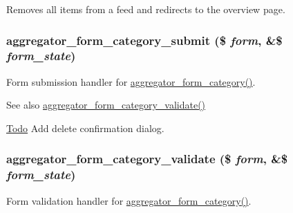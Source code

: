 Removes all items from a feed and redirects to the overview page. \hypertarget{aggregator_8admin_8inc_a56c1cadf416d17bd8dd8a53cc6ed5aeb}{
\subsubsection[{aggregator\_\-form\_\-category\_\-submit}]{\setlength{\rightskip}{0pt plus 5cm}aggregator\_\-form\_\-category\_\-submit (\$ {\em form}, \/  \&\$ {\em form\_\-state})}}
\label{aggregator_8admin_8inc_a56c1cadf416d17bd8dd8a53cc6ed5aeb}
Form submission handler for \hyperlink{group__forms_gaf977e902973833a5a8fe5431ba5b829d}{aggregator\_\-form\_\-category()}.

\begin{DoxySeeAlso}{See also}
\hyperlink{aggregator_8admin_8inc_a419c55e35895dea1f41d5b31908883d5}{aggregator\_\-form\_\-category\_\-validate()}
\end{DoxySeeAlso}
\begin{Desc}
\item[\hyperlink{todo__todo000012}{Todo}]Add delete confirmation dialog. \end{Desc}
\hypertarget{aggregator_8admin_8inc_a419c55e35895dea1f41d5b31908883d5}{
\subsubsection[{aggregator\_\-form\_\-category\_\-validate}]{\setlength{\rightskip}{0pt plus 5cm}aggregator\_\-form\_\-category\_\-validate (\$ {\em form}, \/  \&\$ {\em form\_\-state})}}
\label{aggregator_8admin_8inc_a419c55e35895dea1f41d5b31908883d5}
Form validation handler for \hyperlink{group__forms_gaf977e902973833a5a8fe5431ba5b829d}{aggregator\_\-form\_\-category()}.

